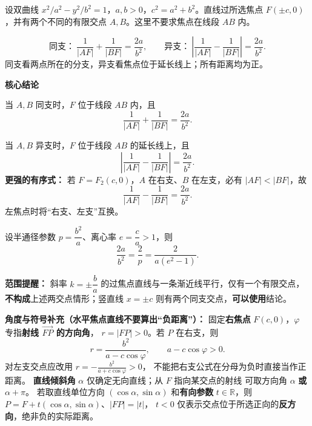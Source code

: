 \begin{statementbox}
设双曲线 $x^2/a^2-y^2/b^2=1$，$a,b>0$，$c^2=a^2+b^2$。直线过所选焦点 $F(\pm c,0)$，并有两个不同的有限交点 $A,B$。这里不要求焦点在线段 $AB$ 内。
\begin{center}\end{center}
\[
 \boxed{\text{同支：}\ \frac1{|AF|}+\frac1{|BF|}=\frac{2a}{b^2}},\qquad
 \boxed{\text{异支：}\ \left|\frac1{|AF|}-\frac1{|BF|}\right|=\frac{2a}{b^2}}.
\]
同支看两点所在的分支，异支看焦点位于延长线上；所有距离均为正。

\end{statementbox}\clearpage\begin{statementbox}
  \textbf{\textcolor{CStatement}{核心结论}}
  \begin{description}[style=nextline,leftmargin=2.8em,labelsep=0.5em,itemsep=0.45em]
    \item[\textbf{结论一（同支：倒数相加）：}]
      当 $A,B$ 同支时，$F$ 位于线段 $AB$ 内，且
      \[
        \boxed{\frac1{|AF|}+\frac1{|BF|}=\frac{2a}{b^2}}.
      \]
    \item[\textbf{结论二（异支：倒数相减）：}]
      当 $A,B$ 异支时，$F$ 位于线段 $AB$ 的延长线上，且
      \[
        \boxed{\left|\frac1{|AF|}-\frac1{|BF|}\right|=\frac{2a}{b^2}}.
      \]
      \textbf{更强的有序式：} 若 $F=F_2(c,0)$，$A$ 在右支、$B$ 在左支，必有 $|AF|<|BF|$，故
      \[
        \boxed{\frac1{|AF|}-\frac1{|BF|}=\frac{2a}{b^2}}.
      \]
      左焦点时将“右支、左支”互换。
    \item[\textbf{统一常数（不用背两份）：}]
      设半通径参数 $p=\dfrac{b^2}{a}$、离心率 $e=\dfrac ca>1$，则
      \[
        \boxed{\frac{2a}{b^2}=\frac2p=\frac{2}{a(e^2-1)}}.
      \]
  \end{description}

  \medskip
  \textbf{\textcolor{CStatement}{范围提醒：}}
  斜率 $k=\pm\dfrac ba$ 的过焦点直线与一条渐近线平行，仅有一个有限交点，\textbf{不构成}上述两交点情形；竖直线 $x=\pm c$ 则有两个同支交点，\textbf{可以使用}结论。



\end{statementbox}\clearpage\begin{statementbox}
  \textbf{\textcolor{CStatement}{角度与符号补充（水平焦点直线不要算出“负距离”）：}}
  固定\textbf{右焦点} $F(c,0)$，$\varphi$ 专指\textbf{射线 $\overrightarrow{FP}$ 的方向角}，
  $r=|FP|>0$。若 $P$ 在右支，则
  \[
    \boxed{r=\frac{b^2}{a-c\cos\varphi}},\qquad
    \boxed{a-c\cos\varphi>0}.
  \]
  对左支交点应改用 $\displaystyle r=-\frac{b^2}{a+c\cos\varphi}>0$，
  不能把右支公式在分母为负时直接当作正距离。
  \textbf{直线倾斜角} $\alpha$ 仅确定无向直线；从 $F$ 指向某交点的射线
  可取方向角 $\alpha$ \textbf{或} $\alpha+\pi$。
  若取直线单位方向 $(\cos\alpha,\sin\alpha)$ 和\textbf{有向参数} $t\in\mathbb R$，则
  $P=F+t(\cos\alpha,\sin\alpha)$、$|FP|=|t|$，
  $t<0$ 仅表示交点位于所选正向的\textbf{反方向}，绝非负的实际距离。


\end{statementbox}

